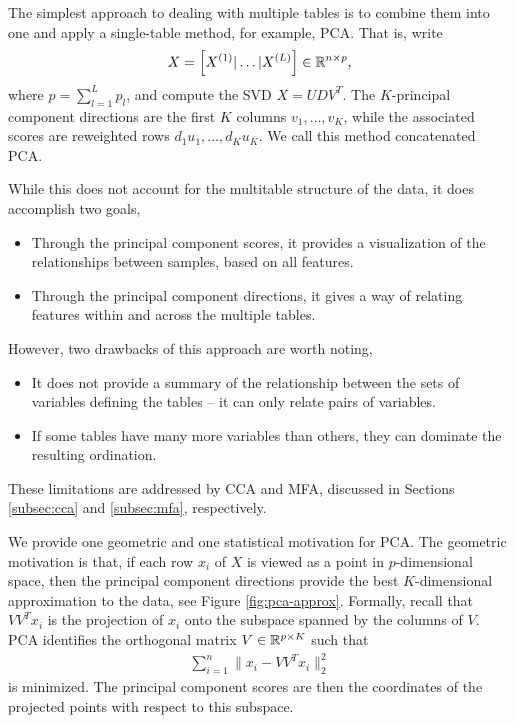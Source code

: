\documentclass[14pt]{extarticle}
\begin{document}
The simplest approach to dealing with multiple tables is to combine them into
one and apply a single-table method, for example, PCA. That is, write
\begin{align*}
X = \left[X^{(1)} \vert \dots \vert X^{(L)}\right] \in \mathbb{R}^{n \times p},
\end{align*}
where $p = \sum_{l = 1}^{L}p_{l}$, and compute the SVD $X = UDV^{T}$. The
$K$-principal component directions are the first $K$ columns $v_{1}, \dots,
v_{K}$, while the associated scores are reweighted rows $d_{1}u_{1}, \dots,
d_{K}u_{K}$. We call this method concatenated PCA.

While this does not account for the multitable structure of the data, it does
accomplish two goals,
\begin{itemize}
\item Through the principal component scores, it provides a visualization of the
  relationships between samples, based on all features.
\item Through the principal component directions, it gives a way of relating
  features within and across the multiple tables.
\end{itemize}

However, two drawbacks of this approach are worth noting,
\begin{itemize}
  \item It does not provide a summary of the relationship between the sets of
    variables defining the tables -- it can only relate pairs of
    variables.
  \item If some tables have many more variables than others, they can dominate
    the resulting ordination.
\end{itemize}

These limitations are addressed by CCA and MFA, discussed in Sections
\ref{subsec:cca} and \ref{subsec:mfa}, respectively.

We provide one geometric and one statistical motivation for PCA. The geometric
motivation is that, if each row $x_{i}$ of $X$ is viewed as a point in
$p$-dimensional space, then the principal component directions provide the best
$K$-dimensional approximation to the data, see Figure \ref{fig:pca-approx}.
Formally, recall that $VV^{T}x_{i}$ is the projection of $x_{i}$ onto the
subspace spanned by the columns of $V$. PCA identifies the orthogonal matrix $V
\in \mathbb{R}^{p \times K}$ such that
\begin{align*}
\sum_{i = 1}^{n}\|x_{i} - VV^{T} x_{i}\|_{2}^{2}
\end{align*}
is minimized. The principal component scores are then the coordinates of the
projected points with respect to this subspace.
\end{document}
